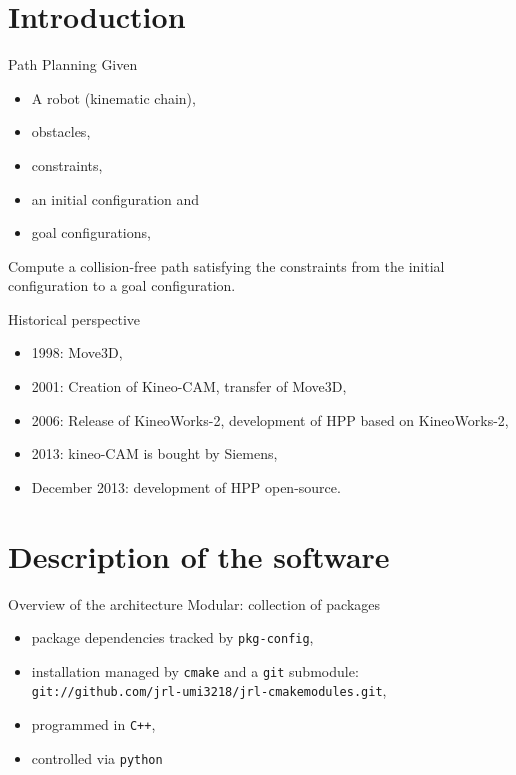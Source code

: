 \section{Introduction}
%
%
\begin {frame} {Path Planning}
  Given
  \begin{itemize}
  \item A robot (kinematic chain),
  \pause
  \item obstacles,
  \pause
  \item constraints,
  \pause
  \item an initial configuration and
  \item goal configurations,
\end{itemize}
  \pause
  Compute a collision-free path satisfying the constraints from the initial
  configuration to a goal configuration.
\end {frame}

%
%

\begin {frame} {Historical perspective}
  \begin{itemize}
    \item 1998: Move3D,
      \pause
    \item 2001: Creation of Kineo-CAM, transfer of Move3D,
      \pause
    \item 2006: Release of KineoWorks-2, development of HPP based on KineoWorks-2,
      \pause
    \item 2013: kineo-CAM is bought by Siemens,
      \pause
    \item December 2013: development of HPP open-source.
  \end{itemize}
\end {frame}

\section {Description of the software}
%
%

\begin {frame} {Overview of the architecture}
  Modular: collection of packages
  \pause
  \begin{itemize}
    \item package dependencies tracked by \texttt{pkg-config},
      \pause
    \item installation managed by \texttt{cmake} and a \texttt{git}
      submodule: {\tiny\texttt{git://github.com/jrl-umi3218/jrl-cmakemodules.git}},
      \pause
    \item programmed in \texttt{C++},
      \pause
    \item controlled via \texttt{python}
  \end{itemize}
\end {frame}


